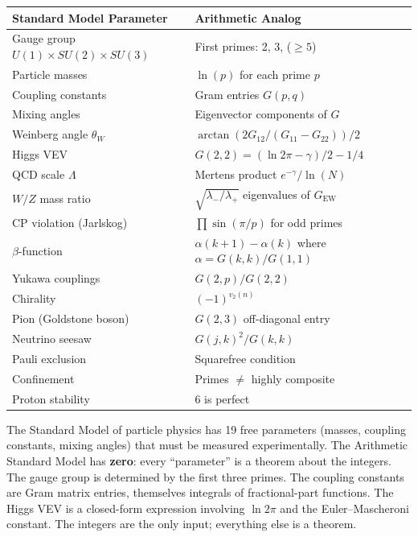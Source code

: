 \begin{center}
\small
\begin{tabular}{@{}ll@{}}
\toprule
\textbf{Standard Model Parameter} & \textbf{Arithmetic Analog} \\
\midrule
Gauge group $U(1) \times SU(2) \times SU(3)$ & First primes: 2, 3, ($\geq 5$) \\
Particle masses & $\ln(p)$ for each prime $p$ \\
Coupling constants & Gram entries $G(p,q)$ \\
Mixing angles & Eigenvector components of $G$ \\
Weinberg angle $\theta_W$ & $\arctan(2G_{12}/(G_{11}-G_{22}))/2$ \\
Higgs VEV & $G(2,2) = (\ln 2\pi - \gamma)/2 - 1/4$ \\
QCD scale $\Lambda$ & Mertens product $e^{-\gamma}/\ln(N)$ \\
$W/Z$ mass ratio & $\sqrt{\lambda_-/\lambda_+}$ eigenvalues of $G_{\text{EW}}$ \\
CP violation (Jarlskog) & $\prod \sin(\pi/p)$ for odd primes \\
$\beta$-function & $\alpha(k+1) - \alpha(k)$ where $\alpha = G(k,k)/G(1,1)$ \\
Yukawa couplings & $G(2,p)/G(2,2)$ \\
Chirality & $(-1)^{v_2(n)}$ \\
Pion (Goldstone boson) & $G(2,3)$ off-diagonal entry \\
Neutrino seesaw & $G(j,k)^2 / G(k,k)$ \\
Pauli exclusion & Squarefree condition \\
Confinement & Primes $\neq$ highly composite \\
Proton stability & $6$ is perfect \\
\bottomrule
\end{tabular}
\end{center}

\begin{remark}
The Standard Model of particle physics has 19 free parameters
(masses, coupling constants, mixing angles) that must be measured
experimentally. The Arithmetic Standard Model has \textbf{zero}:
every ``parameter'' is a theorem about the integers. The gauge
group is determined by the first three primes. The coupling
constants are Gram matrix entries, themselves integrals of
fractional-part functions. The Higgs VEV is a closed-form
expression involving $\ln 2\pi$ and the Euler--Mascheroni constant.
The integers are the only input; everything else is a theorem.
\end{remark}

